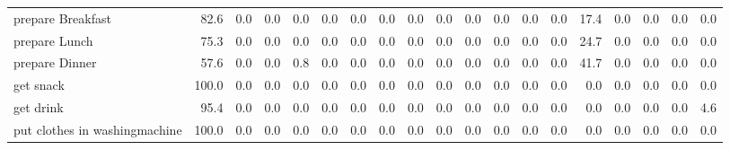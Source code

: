 \documentclass{article}
\begin{document}
\begin{sideways}
\begin{tabular}{lrrrrrrrrrrrrrrrrrr}
prepare Breakfast             &        82.6 &                0.0 &           0.0 &                          0.0 &                0.0 &                0.0 &                        0.0 &          0.0 &              0.0 &                0.0 &                    0.0 &                      0.0 &                  0.0 &                  17.4 &              0.0 &              0.0 &                                  0.0 &          0.0 \\
prepare Lunch                 &        75.3 &                0.0 &           0.0 &                          0.0 &                0.0 &                0.0 &                        0.0 &          0.0 &              0.0 &                0.0 &                    0.0 &                      0.0 &                  0.0 &                  24.7 &              0.0 &              0.0 &                                  0.0 &          0.0 \\
prepare Dinner                &        57.6 &                0.0 &           0.0 &                          0.8 &                0.0 &                0.0 &                        0.0 &          0.0 &              0.0 &                0.0 &                    0.0 &                      0.0 &                  0.0 &                  41.7 &              0.0 &              0.0 &                                  0.0 &          0.0 \\
get snack                     &       100.0 &                0.0 &           0.0 &                          0.0 &                0.0 &                0.0 &                        0.0 &          0.0 &              0.0 &                0.0 &                    0.0 &                      0.0 &                  0.0 &                   0.0 &              0.0 &              0.0 &                                  0.0 &          0.0 \\
get drink                     &        95.4 &                0.0 &           0.0 &                          0.0 &                0.0 &                0.0 &                        0.0 &          0.0 &              0.0 &                0.0 &                    0.0 &                      0.0 &                  0.0 &                   0.0 &              0.0 &              0.0 &                                  0.0 &          4.6 \\
put clothes in washingmachine &       100.0 &                0.0 &           0.0 &                          0.0 &                0.0 &                0.0 &                        0.0 &          0.0 &              0.0 &                0.0 &                    0.0 &                      0.0 &                  0.0 &                   0.0 &              0.0 &              0.0 &                                  0.0 &          0.0 \\

\end{tabular}
\end{sideways}
\end{document}
